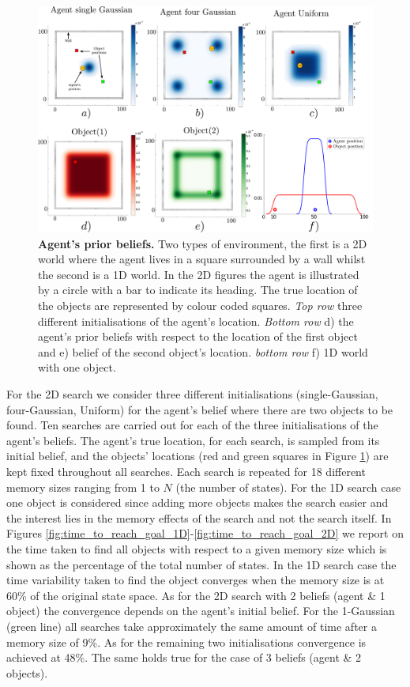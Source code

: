 \begin{figure}
  \includegraphics[width=\textwidth]{./ch5-MLMF/Figures/exploration_initialisation.pdf}
  \caption{\textbf{Agent's prior beliefs.} Two types of environment, the first is 
  a 2D world where the agent lives in a square surrounded by a wall whilst the second is a 1D
  world. In the 2D figures the agent is illustrated by a circle with a bar to indicate its heading. The true location 
  of the objects are represented by colour coded squares. \textit{Top row} three different initialisations of the agent's location. 
  \textit{Bottom row} d) the agent's prior beliefs with respect to the location of the first object and e) belief of the second object's location.
  \textit{bottom row} f) 1D world with one object.}
  \label{fig:exploration_init}
\end{figure}

For the 2D search we consider three different initialisations (single-Gaussian, four-Gaussian, Uniform) for the agent's belief where there are 
two objects to be found. Ten searches are carried out for each of the three initialisations of the agent's beliefs. 
The agent's true location, for each search, is sampled from its initial belief, and the objects' locations 
(red and green squares in Figure \ref{fig:exploration_init}) are kept fixed throughout all searches. Each search is repeated for 
18 different memory sizes ranging from 1 to $N$ (the number of states). For the 1D search case one object is considered since adding more objects  
makes the search easier and the interest lies in the memory effects of the search and not the search itself. In Figures \ref{fig:time_to_reach_goal_1D}-\ref{fig:time_to_reach_goal_2D} we 
report on the time taken to find all objects with respect to a given memory size which is shown as the percentage of the total number of states. 
In the 1D search case the time variability taken to find the object converges when the memory size is at 60\% of the original state space. 
As for the 2D search with 2 beliefs (agent \& 1 object) the convergence depends on the agent's initial belief. For the 1-Gaussian (green line) 
all searches take approximately the same amount of time after a memory size of 9\%. As for the remaining two initialisations convergence is achieved at  48\%. 
The same holds true for the case of 3 beliefs (agent \& 2 objects).

